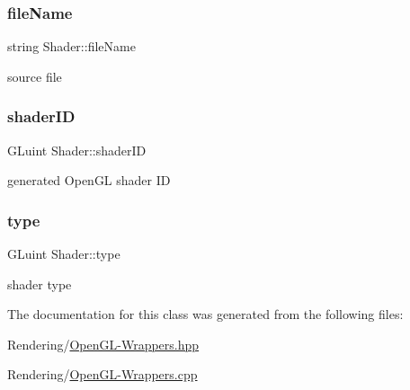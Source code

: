 \subsubsection{\texorpdfstring{file\+Name}{fileName}}
{\footnotesize\ttfamily string Shader\+::file\+Name}



source file 

\mbox{\label{classShader_ae94be9c66b18fe70ed6ec0863b416bdf}} 
\subsubsection{\texorpdfstring{shader\+ID}{shaderID}}
{\footnotesize\ttfamily G\+Luint Shader\+::shader\+ID}



generated Open\+GL shader ID 

\mbox{\label{classShader_a855410473ea5bf5ea56e37f6c09543da}} 
\subsubsection{\texorpdfstring{type}{type}}
{\footnotesize\ttfamily G\+Luint Shader\+::type}



shader type 



The documentation for this class was generated from the following files\+:\begin{DoxyCompactItemize}
\item 
Rendering/\mbox{\hyperlink{OpenGL-Wrappers_8hpp}{Open\+G\+L-\/\+Wrappers.\+hpp}}\item 
Rendering/\mbox{\hyperlink{OpenGL-Wrappers_8cpp}{Open\+G\+L-\/\+Wrappers.\+cpp}}\end{DoxyCompactItemize}
